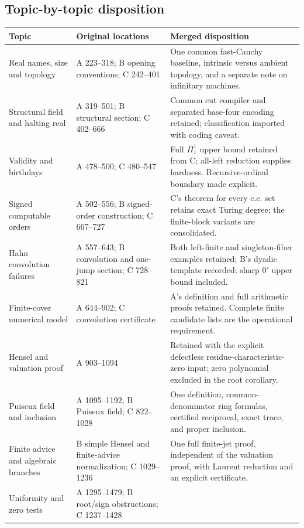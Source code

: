 \documentclass[11pt,letterpaper]{article}
\numberwithin{equation}{section}
\theoremstyle{definition}
\theoremstyle{remark}
\begin{document}
\subsection{Topic-by-topic disposition}
\small
\begin{longtable}{@{}p{}p{}p{}@{}}
\toprule
Topic & Original locations & Merged disposition\\
\midrule
\endhead
Real names, size and topology & A 223--318; B opening conventions; C 242--401 &
One common fast-Cauchy baseline, intrinsic versus ambient topology, and a separate note on infinitary machines.\\
Structural field and halting real & A 319--501; B structural section; C 402--666 &
Common cut compiler and separated base-four encoding retained; classification imported with coding caveat.\\
Validity and birthdays & A 478--500; C 480--547 &
Full $\Pi^1_1$ upper bound retained from C; all-left reduction supplies hardness. Recursive-ordinal boundary made explicit.\\
Signed computable orders & A 502--556; B signed-order construction; C 667--727 &
C's theorem for every c.e. set retains exact Turing degree; the finite-block variants are consolidated.\\
Hahn convolution failures & A 557--643; B convolution and one-jump section; C 728--821 &
Both left-finite and singleton-fiber examples retained; B's dyadic template recorded; sharp $0'$ upper bound included.\\
Finite-cover numerical model & A 644--902; C convolution certificate &
A's definition and full arithmetic proofs retained. Complete finite candidate lists are the operational requirement.\\
Hensel and valuation proof & A 903--1094 &
Retained with the explicit defectless residue-characteristic-zero input; zero polynomial excluded in the root corollary.\\
Puiseux field and inclusion & A 1095--1192; B Puiseux field; C 822--1028 &
One definition, common-denominator ring formulas, certified reciprocal, exact trace, and proper inclusion.\\
Finite advice and algebraic branches & B simple Hensel and finite-advice normalization; C 1029--1236 &
One full finite-jet proof, independent of the valuation proof, with Laurent reduction and an explicit certificate.\\
Uniformity and zero tests & A 1295--1479; B root/sign obstructions; C 1237--1428 &

\end{longtable}
\end{document}
